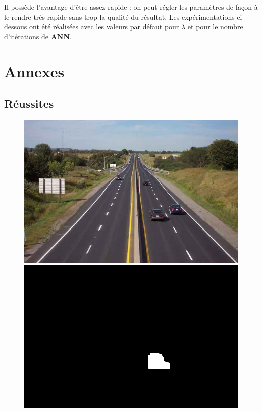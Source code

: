 \documentclass[a4paper, 10pt]{article}
\begin{document}
Il possède l’avantage d'être assez rapide : on peut régler les paramètres de façon à le rendre très rapide sans trop la qualité du résultat. Les expérimentations ci-dessous ont été réalisées avec les valeurs par défaut pour $\lambda$ et pour le nombre d'itérations de \textbf{ANN}.  



  
\section{Annexes}
\subsection{Réussites}
\begin{figure}[H]
\begin{minipage}{.4\textwidth}
\centering
\includegraphics[scale=0.14]{images/highway.jpg}
\end{minipage}%
\begin{minipage}{.4\textwidth}
\centering
\includegraphics[scale=0.14]{highway-mask.png}

\end{minipage}
\end{figure}
\end{document}
